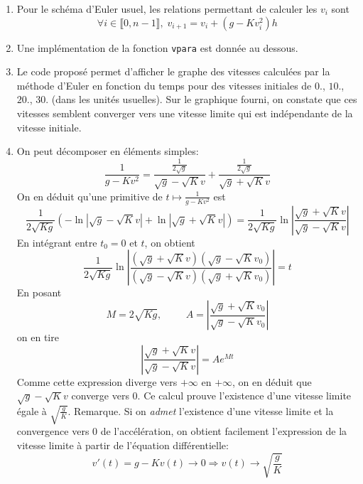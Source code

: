 \begin{enumerate}
  \item Pour le schéma d'Euler usuel, les relations permettant de calculer les $v_i$ sont
\begin{displaymath}
\forall i\in \llbracket 0, n-1 \rrbracket,\; v_{i+1} = v_i + (g - Kv_i^2)h  
\end{displaymath}

  \item Une implémentation de la fonction \texttt{vpara} est donnée au dessous. 


  \item Le code proposé permet d'afficher le graphe des vitesses calculées par la méthode d'Euler en fonction du temps pour des vitesses initiales de $0.$, $10.$, $20.$, $30.$ (dans les unités usuelles). Sur le graphique fourni, on constate que ces vitesses semblent converger vers une vitesse limite qui est indépendante de la vitesse initiale.
  
  \item On peut décomposer en éléments simples:
\begin{displaymath}
  \frac{1}{g - Kv^2} = \frac{\frac{1}{2\sqrt{g}}}{\sqrt{g} - \sqrt{K}v} + \frac{\frac{1}{2\sqrt{g}}}{\sqrt{g} + \sqrt{K}v}
\end{displaymath}
On en déduit qu'une primitive de $t\mapsto \frac{1}{g - Kv^2}$ est
\begin{displaymath}
  \frac{1}{2\sqrt{Kg}}\left( -\ln|\sqrt{g} - \sqrt{K}v| + \ln|\sqrt{g} + \sqrt{K}v|\right) 
  = \frac{1}{2\sqrt{Kg}} \ln \left| \frac{\sqrt{g} + \sqrt{K}v}{\sqrt{g} - \sqrt{K}v}\right|
\end{displaymath}
En intégrant entre $t_0 = 0$ et $t$, on obtient
\begin{displaymath}
 \frac{1}{2\sqrt{Kg}}\ln \left| \frac{(\sqrt{g} + \sqrt{K}v)(\sqrt{g} - \sqrt{K}v_0)}{(\sqrt{g} - \sqrt{K}v)(\sqrt{g} + \sqrt{K}v_0)}\right| = t
\end{displaymath}
En posant 
\begin{displaymath}
  M = 2\sqrt{Kg},\hspace{1cm} A = \left|\frac{\sqrt{g} + \sqrt{K}v_0}{\sqrt{g} - \sqrt{K}v_0}\right|
\end{displaymath}
on en tire
\begin{displaymath}
\left|\frac{\sqrt{g} + \sqrt{K}v}{\sqrt{g} - \sqrt{K}v}\right|
= Ae^{Mt}
\end{displaymath}
Comme cette expression diverge vers $+\infty$ en $+\infty$, on en déduit que $\sqrt{g} - \sqrt{K}v$ converge vers $0$. Ce calcul prouve l'existence d'une vitesse limite égale à $\sqrt{\frac{g}{K}}$.\newline
Remarque.\newline
Si on \emph{admet} l'existence d'une vitesse limite et la convergence vers $0$ de l'accélération, on obtient facilement l'expression de la vitesse limite à partir de l'équation différentielle:
\begin{displaymath}
  v'(t) = g - Kv(t) \rightarrow 0 \Rightarrow v(t)\rightarrow \sqrt{\frac{g}{K}}
\end{displaymath}

\end{enumerate}

